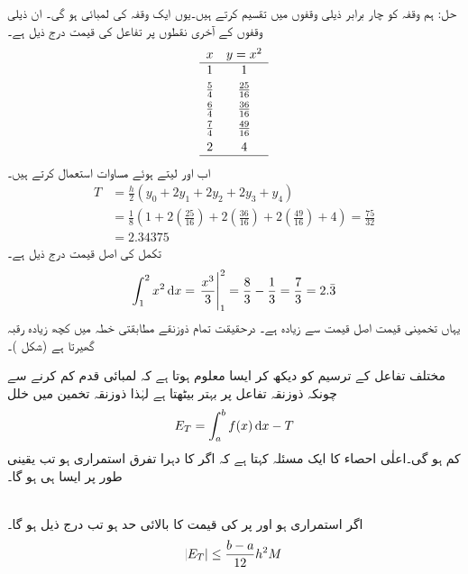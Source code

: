 حل:\quad
ہم وقفہ  کو چار برابر ذیلی وقفوں میں تقسیم کرتے ہیں۔یوں ایک وقفہ کی لمبائی  ہو گی۔ ان ذیلی وقفوں کے آخری نقطوں پر تفاعل  کی قیمت  درج ذیل ہے۔
\begin{align*}
\begin{array}{cc}
x&y=x^2\\
\hline
1&1\\[0.75ex]
\frac{5}{4}&\frac{25}{16}\\[0.75ex]
\frac{6}{4}&\frac{36}{16}\\[0.75ex]
\frac{7}{4}&\frac{49}{16}\\[0.75ex]
2&4\\
\hline
\end{array}
\end{align*}
 اب  اور  لیتے ہوئے مساوات  استعمال کرتے ہیں۔
\begin{align*}
T&=\frac{h}{2}(y_0+2y_1+2y_2+2y_3+y_4)\\
&=\frac{1}{8}(1+2(\tfrac{25}{16})+2(\tfrac{36}{16})+2(\tfrac{49}{16})+4)=\frac{75}{32}\\
&=\num{2.34375}
\end{align*} 
تکمل کی اصل قیمت درج ذیل ہے۔
\begin{align*}
\int_1^2x^2\dif x=\left.\frac{x^3}{3}\right\vert_1^2=\frac{8}{3}-\frac{1}{3}=\frac{7}{3}=2.\bar{3}
\end{align*}
یہاں تخمینی قیمت اصل قیمت سے زیادہ ہے۔ درحقیقت تمام ذوزنقے مطابقتی خطہ میں کچھ زیادہ رقبہ گھیرتا ہے (شکل )۔

مختلف تفاعل کے ترسیم کو دیکھ کر ایسا معلوم ہوتا ہے  کہ لمبائی قدم  کم کرنے سے چونکہ ذوزنقہ تفاعل پر بہتر بیٹھتا ہے لہٰذا ذوزنقہ تخمین میں خلل
\begin{align}
E_T=\int_a^bf(x)\dif x-T
\end{align}
 کم ہو گی۔اعلٰی احصاء کا ایک مسئلہ کہتا ہے کہ اگر  کا دہرا تفرق استمراری ہو تب یقینی طور پر ایسا ہی ہو گا۔

\\
اگر  استمراری ہو اور  پر  کی قیمت کا بالائی حد   ہو تب درج ذیل ہو گا۔
\begin{align}\label{مساوات_تکمل_ذوزنقہ_قاعدہ_خلل_مطلق}
\abs{E_T}\le \frac{b-a}{12}h^2M
\end{align} 

